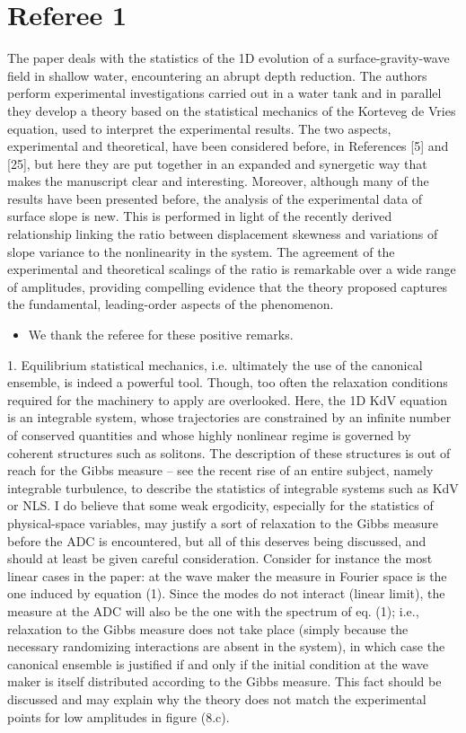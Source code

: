 \documentclass[11pt]{article}
\newcommand{\comment}[1]{{\color{blue} #1}}
\begin{document}
\section*{Referee 1}

\noindent
\comment{The paper deals with the statistics of the 1D evolution of a surface-gravity-wave field in shallow water, encountering an abrupt depth reduction. The authors perform experimental investigations carried out in a water tank and in parallel they develop a theory based on the statistical mechanics of the Korteveg de Vries equation, used to interpret the experimental results. The two aspects, experimental and theoretical, have been considered before, in References [5] and [25], but here they are put together in an expanded and synergetic way that makes the manuscript clear and interesting. Moreover, although many of the results have been presented before, the analysis of the experimental data of surface slope is new. This is performed in light of the recently derived relationship linking the ratio between displacement skewness and variations of slope variance to the nonlinearity in the system. The agreement of the experimental and theoretical scalings of the ratio is remarkable over a wide range of amplitudes, providing compelling evidence that the theory proposed captures the fundamental, leading-order aspects of the phenomenon.
}
\begin{itemize}
\item We thank the referee for these positive remarks.
\end{itemize}

\noindent
\comment{
1. Equilibrium statistical mechanics, i.e. ultimately the use of the canonical ensemble, is indeed a powerful tool. Though, too often the relaxation conditions required for the machinery to apply are overlooked. Here, the 1D KdV equation is an integrable system, whose trajectories are constrained by an infinite number of conserved quantities and whose highly nonlinear regime is governed by coherent structures such as solitons. The description of these structures is out of reach for the Gibbs measure – see the recent rise of an entire subject, namely integrable turbulence, to describe the statistics of integrable systems such as KdV or NLS. I do believe that some weak ergodicity, especially for the statistics of physical-space variables, may justify a sort of relaxation to the Gibbs measure before the ADC is encountered, but all of this deserves being discussed, and should at least be given careful consideration. Consider for instance the most linear cases in the paper: at the wave maker the measure in Fourier space is the one induced by equation (1). Since the modes do not interact (linear limit), the measure at the ADC will also be the one with the spectrum of eq. (1); i.e., relaxation to the Gibbs measure does not take place (simply because the necessary randomizing interactions are absent in the system), in which case the canonical ensemble is justified if and only if the initial condition at the wave maker is itself distributed according to the Gibbs measure. This fact should be discussed and may explain why the theory does not match the experimental points for low amplitudes in figure (8.c).}
\end{document}
